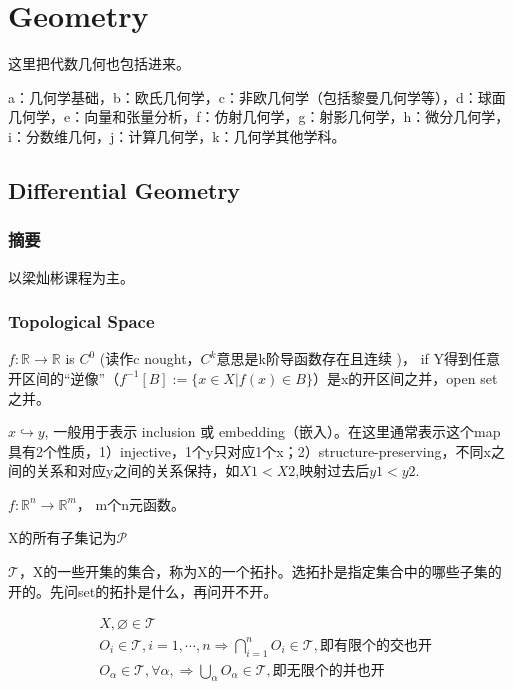 

\chapter{Geometry}

这里把代数几何也包括进来。

a：几何学基础，b：欧氏几何学，c：非欧几何学（包括黎曼几何学等），d：球面几何学，e：向量和张量分析，f：仿射几何学，g：射影几何学，h：微分几何学，i：分数维几何，j：计算几何学，k：几何学其他学科。



\section{Differential Geometry}
\subsection{摘要}
以梁灿彬课程为主。


\subsection{Topological Space}


$f: \mathbb{R} \to \mathbb{R} $ is $C^0$ (读作c nought，$C^k$意思是k阶导函数存在且连续 )， if Y得到任意开区间的“逆像”（$f^{-1}[B] := \{x \in X | f(x) \in B\}$）是x的开区间之并，open set 之并。

$x \hookrightarrow y$, 一般用于表示 inclusion 或 embedding（嵌入）。在这里通常表示这个map具有2个性质，1）injective，1个y只对应1个x；2）structure-preserving，不同x之间的关系和对应y之间的关系保持，如$X1 < X2$,映射过去后$y1 < y2$.

$f: \mathbb{R}^n \to \mathbb{R}^m $， m个n元函数。

X的所有子集记为$\mathscr P$

$\mathscr T$，X的一些开集的集合，称为X的一个拓扑。选拓扑是指定集合中的哪些子集的开的。先问set的拓扑是什么，再问开不开。

\begin{equation}
    \begin{split}
    &X, \varnothing \in \mathscr T\\
    &O_i \in\mathscr T, i=1, \cdots, n \Longrightarrow \bigcap _{i=1}^n O_i  \in\mathscr T, 即有限个的交也开 \\
    &O_\alpha \in\mathscr T, \forall \alpha, \Longrightarrow \bigcup  _\alpha  O_\alpha \in\mathscr T,  即无限个的并也开 \\
    \end{split}
  \end{equation}


